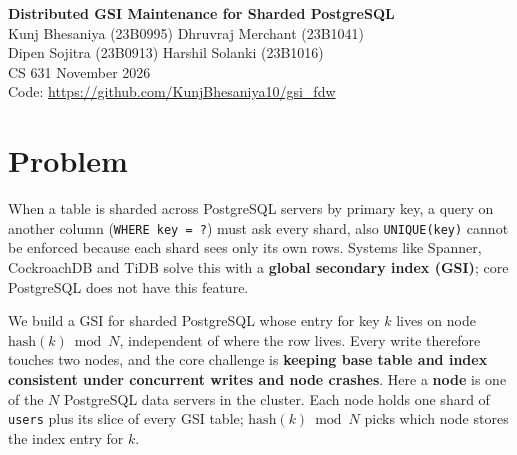 \documentclass[11pt,a4paper]{article}
\begin{document}
\begin{center}
  {\large\bfseries Distributed GSI Maintenance for Sharded PostgreSQL}\\[4pt]
  {\small Kunj Bhesaniya (23B0995) \quad Dhruvraj Merchant (23B1041)\\
  Dipen Sojitra (23B0913) \quad Harshil Solanki (23B1016)}\\[2pt]
  {\small CS 631 \textperiodcentered{} November 2026}\\[2pt]
  {\small Code: \url{https://github.com/KunjBhesaniya10/gsi_fdw}}
\end{center}

\section*{Problem}
When a table is sharded across PostgreSQL servers by primary key, a query on another column
(\texttt{WHERE key = ?}) must ask every shard, also \texttt{UNIQUE(key)} cannot be enforced because
each shard sees only its own rows. Systems like Spanner, CockroachDB and TiDB solve this with a
\textbf{global secondary index (GSI)}; core PostgreSQL does not have this feature.

We build a GSI for sharded PostgreSQL whose entry for key $k$ lives on node $\mathrm{hash}(k) \bmod N$,
independent of where the row lives. Every write therefore touches two nodes, and the core challenge is
\textbf{keeping base table and index consistent under concurrent writes and node crashes}. Here a
\textbf{node} is one of the $N$ PostgreSQL data servers in the cluster. Each node holds one shard of
\texttt{users} plus its slice of every GSI table; $\mathrm{hash}(k) \bmod N$ picks which node stores the
index entry for $k$.
\end{document}
